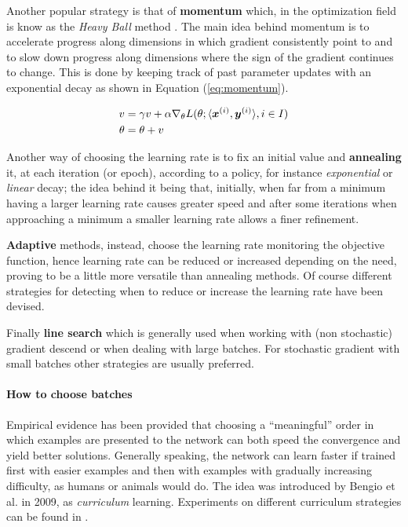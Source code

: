Another popular strategy is that of \textbf{momentum} which, in the optimization field is know as the \textit{Heavy 
Ball} method \cite{momentum}.
The main idea behind momentum is to accelerate progress along dimensions
in which gradient consistently point to and to slow down progress along dimensions where the sign of the gradient continues to change. This is done by keeping
track of past parameter updates with an exponential decay as shown in Equation (\ref{eq:momentum}).

\begin{align}
\label{eq:momentum}
v &= \gamma v+ \alpha \nabla_\theta L(\theta; \langle\boldsymbol{x}^{(i)},\boldsymbol{y}^{(i)}\rangle, i\in I)\\
\theta &= \theta + v
\end{align}

Another way of choosing the learning rate is to fix an initial value and \textbf{annealing} it, at each iteration (or epoch), according to a policy, for instance \textit{exponential} or \textit{linear} decay; the idea behind it being that, initially, when far from a minimum having a larger learning rate causes greater speed and after some iterations when approaching a minimum a smaller learning rate allows a finer refinement.

\textbf{Adaptive} methods, instead, choose the learning rate monitoring the objective function, hence learning rate can be reduced
or increased depending on the need, proving to be a little more versatile than annealing methods. Of course different strategies for detecting when to reduce or increase the learning rate have been devised.

Finally \textbf{line search} which is generally used when working with (non stochastic) gradient descend or when dealing with large batches. For stochastic gradient with small batches other strategies are usually 
preferred.

\paragraph{How to choose batches}

Empirical evidence has been provided that choosing a ``meaningful'' order in which examples are presented to the network can both speed the convergence and yield better solutions. Generally speaking, the network can learn faster if trained first with easier examples and then with examples with gradually increasing difficulty, as humans or animals would do. The idea was introduced by Bengio et al.\cite{curriculumLearning} in 2009, as \textit{curriculum} learning. Experiments on different curriculum strategies can be found in \cite{learningToExecute}.

